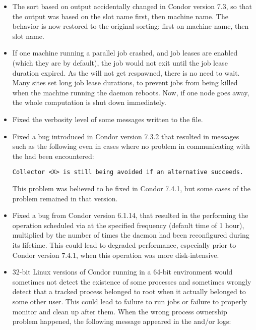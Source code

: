 \begin{itemize}
\item The sort based on  output accidentally changed in 
Condor version 7.3,
so that the output was based on the slot name first, then machine name.
The behavior is now restored to the original sorting: first on machine name,
then slot name.

\item If one machine running a parallel job crashed,
and job leases are enabled (which they are by default),
the job would not exit until the job lease duration expired.
As the  will not get respawned,
there is no need to wait.
Many sites set long job lease durations,
to prevent jobs from being killed when the machine running
the  daemon reboots.
Now, if one node goes away, the whole computation is shut down immediately.

\item Fixed the verbosity level of some  messages written to
the  file.

\item Fixed a bug introduced in Condor version 7.3.2 that resulted in
  messages such as the following even in cases where no problem in
  communicating with the  had been encountered:

\begin{verbatim}
Collector <X> is still being avoided if an alternative succeeds.
\end{verbatim}

This problem was believed to be fixed in Condor 7.4.1, but some cases
of the problem remained in that version.

\item Fixed a bug from Condor version 6.1.14,
that resulted in the  performing
the operation scheduled via  at the
specified frequency (default time of 1 hour),
multiplied by the number of times the
 daemon had been reconfigured during its lifetime.
This could lead to degraded performance,
especially prior to Condor version 7.4.1,
when this operation was more disk-intensive.

\item 32-bit Linux versions of Condor running in a 64-bit environment would
sometimes not detect the existence of some processes and sometimes
wrongly detect that a tracked process belonged to root when it
actually belonged to some other user.  This could lead to failure to run
jobs or failure to properly monitor and clean up after them.  When the wrong
process ownership problem happened,
the following message appeared in the  and/or 
logs:


\end{itemize}
